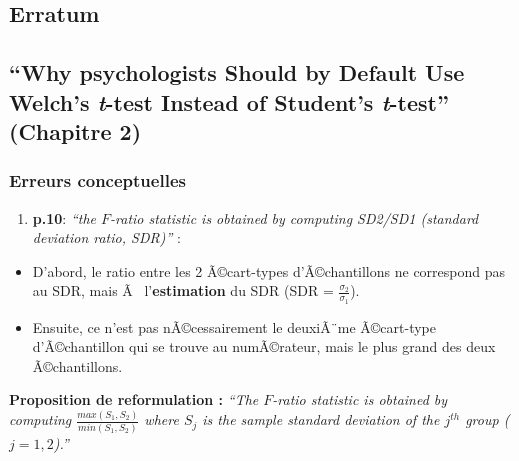 \clearpage



\begin{appendix}
\hypertarget{erratum}{%
\section{Erratum}\label{erratum}}

\hypertarget{why-psychologists-should-by-default-use-welchs-t-test-instead-of-students-t-test-chapitre-2}{%
\subsection{\texorpdfstring{``Why psychologists Should by Default Use
Welch's \emph{t}-test Instead of Student's \emph{t}-test'' (Chapitre
2)}{``Why psychologists Should by Default Use Welch's t-test Instead of Student's t-test'' (Chapitre 2)}}\label{why-psychologists-should-by-default-use-welchs-t-test-instead-of-students-t-test-chapitre-2}}

\hypertarget{erreurs-conceptuelles}{%
\subsubsection{Erreurs conceptuelles}\label{erreurs-conceptuelles}}

\begin{enumerate}
\def\labelenumi{\arabic{enumi})}
\tightlist
\item
  \textbf{p.10}: \emph{``the \(F\)-ratio statistic is obtained by
  computing SD2/SD1 (standard deviation ratio, SDR)''} :\\
\end{enumerate}

\begin{itemize}
\tightlist
\item
  D'abord, le ratio entre les 2 Ã©cart-types d'Ã©chantillons ne
  correspond pas au SDR, mais Ã~ l'\textbf{estimation} du SDR (SDR =
  \(\frac{\sigma_2}{\sigma_1}\)).\\
\item
  Ensuite, ce n'est pas nÃ©cessairement le deuxiÃ¨me Ã©cart-type
  d'Ã©chantillon qui se trouve au numÃ©rateur, mais le plus grand des
  deux Ã©chantillons.
\end{itemize}

\color{blue} \textbf{Proposition de reformulation : } \emph{``The
\(F\)-ratio statistic is obtained by computing
\(\frac{max(S_1,S_2)}{min(S_1,S_2)}\) where \(S_j\) is the sample
standard deviation of the \(j^{th}\) group (\(j=1,2\)).''}


\end{appendix}
